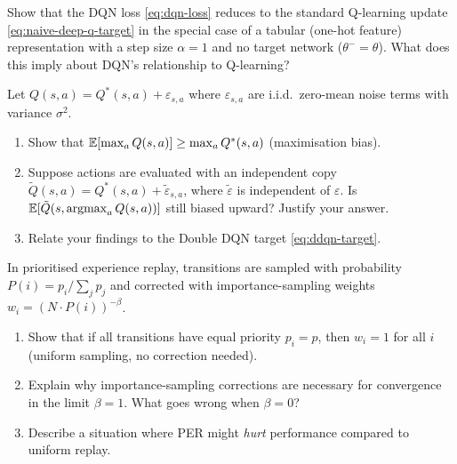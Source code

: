 \begin{exercise}
\label{ex:dqn-loss}
Show that the DQN loss \eqref{eq:dqn-loss} reduces to the standard Q-learning update
\eqref{eq:naive-deep-q-target} in the special case of a tabular (one-hot feature) representation
with a step size $\alpha = 1$ and no target network ($\theta^- = \theta$).  What does this imply
about DQN's relationship to Q-learning?
\end{exercise}

\begin{exercise}
\label{ex:double-dqn}
Let $Q(s, a) = Q^*(s, a) + \varepsilon_{s,a}$ where $\varepsilon_{s,a}$ are i.i.d.\ zero-mean
noise terms with variance $\sigma^2$.
\begin{enumerate}
\item Show that $\operatorname{\mathbb{E}}[\max_{a} Q(s, a)] \geq \max_a Q^*(s, a)$ (maximisation bias).
\item Suppose actions are evaluated with an independent copy $\tilde{Q}(s, a) = Q^*(s, a) +
  \tilde{\varepsilon}_{s,a}$, where $\tilde{\varepsilon}$ is independent of $\varepsilon$.
  Is $\operatorname{\mathbb{E}}[\tilde{Q}(s, \operatorname*{argmax}_a Q(s,a))]$ still biased upward?  Justify your answer.
\item Relate your findings to the Double DQN target \eqref{eq:ddqn-target}.
\end{enumerate}
\end{exercise}

\begin{exercise}
\label{ex:per-is-weights}
In prioritised experience replay, transitions are sampled with probability
$P(i) = p_i / \sum_j p_j$ and corrected with importance-sampling weights
$w_i = (N \cdot P(i))^{-\beta}$.
\begin{enumerate}
\item Show that if all transitions have equal priority $p_i = p$, then $w_i = 1$ for all $i$
  (uniform sampling, no correction needed).
\item Explain why importance-sampling corrections are necessary for convergence in the limit
  $\beta = 1$.  What goes wrong when $\beta = 0$?
\item Describe a situation where PER might \emph{hurt} performance compared to uniform replay.
\end{enumerate}
\end{exercise}

